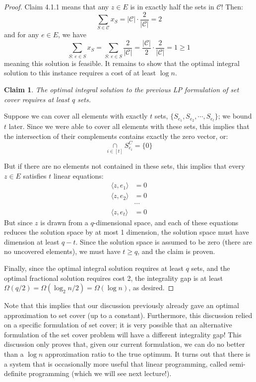\documentclass[11pt]{article}
\newtheorem{claim}{Claim}[theorem]
\newcommand{\C}{\mathcal{C}}
\begin{document}
\begin{proof}
Claim 4.1.1 means that any $z \in E$ is in exactly half the sets in $\C$!  Then: 
$$\sum_{S \in \C} x_S = |\C| \cdot \frac{2}{|\C|} = 2$$
and for any $e \in E$, we have 
$$\sum_{S\text{: } e \in S} x_S = \sum_{S\text{: } e \in S} \frac{2}{|\C|} = \frac{|\C|}{2} \cdot \frac{2}{|\C|} = 1 \ge 1$$
meaning this solution is feasible.  It remains to show that the optimal integral solution to this instance requires a cost of at least $\log n$.

\begin{framed}\begin{claim}
The optimal integral solution to the previous LP formulation of set cover requires at least $q$ sets.
\end{claim}\end{framed}
Suppose we can cover all elements with exactly $t$ sets, $\{S_{e_1}, S_{e_2}, \cdots, S_{e_t}\}$; we bound $t$ later.  Since we were able to cover all elements with these sets, this implies that the intersection of their complements contains exactly the zero vector, or:
$$\underset{i \in [t]}{\cap} S_{e_i}^C = \{0\}$$

But if there are no elements not contained in these sets, this implies that every $z \in E$ satisfies $t$ linear equations:
\begin{align*}
\langle z, e_1 \rangle &= 0 \\
\langle z, e_2 \rangle &= 0 \\
&\cdots \\
\langle z, e_t \rangle &= 0
\end{align*}
But since $z$ is drawn from a $q$-dimensional space, and each of these equations reduces the solution space by at most 1 dimension, the solution space must have dimension at least $q - t$.  Since the solution space is assumed to be zero (there are no uncovered elements), we must have $t \ge q$, and the claim is proven.

Finally, since the optimal integral solution requires at least $q$ sets, and the optimal fractional solution requires cost 2, the integrality gap is at least $\Omega(q/2) = \Omega(\log_2 n / 2) = \boxed{\Omega(\log n)}$, as desired.
\end{proof}
Note that this implies that our discussion previously already gave an optimal approximation to set cover (up to a constant).  Furthermore, this discussion relied on a specific formulation of set cover; it is very possible that an alternative formulation of the set cover problem will have a different integrality gap!  This discussion only proves that, given our current formulation, we can do no better than a $\log n$ approximation ratio to the true optimum.  It turns out that there is a system that is occasionally more useful that linear programming, called semi-definite programming (which we will see next lecture!).
\end{document}
